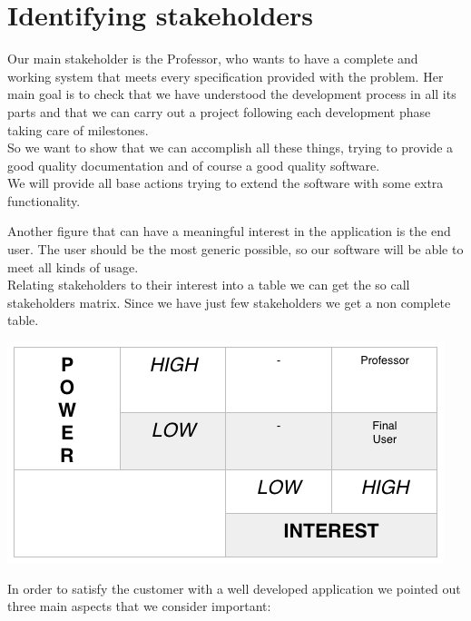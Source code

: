 \documentclass[12pt]{book}
\begin{document}
\section{Identifying stakeholders}
Our main stakeholder is the Professor, who wants to have a complete and working system that meets every specification provided with the problem.  
Her main goal is to check that we have understood the development process in all its parts and that we can carry out a project following each development phase taking care of milestones. \\
So we want to show that we can accomplish all these things, trying to provide a good quality documentation and of course a good quality software. \\
We will provide all base actions trying to extend the software with some extra functionality. \\ 
\vspace{0.2cm}

Another figure that can have a meaningful interest in the application is the end user. The user should be the most generic possible, so our software will be able to meet all kinds of usage. \\
Relating stakeholders to their interest into a table we can get the so call stakeholders matrix. Since we have just few stakeholders we get a non complete table. \\ 
\vspace{0.5cm}
\begin{center}
\includegraphics[scale=0.6]{matrix}\\
\end{center}
In order to satisfy the customer with a well developed application we pointed out three main aspects that we consider important: 
\end{document}
